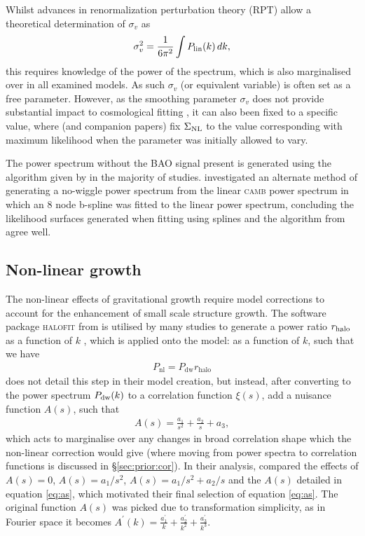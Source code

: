 \documentclass[titlesmallcaps, examinerscopy, copyrightpage]{uqthesis}
\newcommand{\camb}{\textsc{camb}}
\newcommand{\halofit}{\textsc{halofit}}
\begin{document}
Whilst advances in renormalization perturbation theory (RPT)  \citep{CrocceScoccimarro2008} allow a theoretical determination of $\sigma_v$ as
\begin{align} \label{eq:sigmav}
\sigma_v^2 = \frac{1}{6\pi^2} \int P_{\rm{lin}}(k)\, dk,
\end{align}
this requires knowledge of the power of the spectrum, which is also marginalised over in all examined models. As such $\sigma_v$ (or equivalent variable) is often set as a free parameter. However, as the smoothing parameter $\sigma_v$ does not provide substantial impact to cosmological fitting \citep{ReidPercival2010, XuPadmanabhan2012}, it can also been fixed to a specific value, where \citet{XuPadmanabhan2012} (and companion papers) fix $\Sigma_{\rm{NL}}$ to the value corresponding with maximum likelihood when the parameter was initially allowed to vary.



The power spectrum without the BAO signal present is generated using the algorithm given by \citet{EisensteinHu1998} in the majority of studies. \citet{ReidPercival2010} investigated an alternate method of generating a no-wiggle power spectrum from the linear \camb{} power spectrum in which an 8 node b-spline was fitted to the linear power spectrum, concluding the likelihood surfaces generated when fitting using splines and the algorithm from \citet{EisensteinHu1998} agree well.


\subsection{Non-linear growth}

The non-linear effects of gravitational growth require model corrections to account for the enhancement of small scale structure growth. The software package \halofit{} from \citet{Smith2003} is utilised by many studies to generate a power ratio $r_{\rm{halo}}$ as a function of $k$ \citep{ReidPercival2010, BlakeDavis2011, ChuangWang2012}, which is applied onto the model:
 as a function of $k$, such that we have
\begin{align}
P_{\text{nl}} = P_{\text{dw}} r_{\text{halo}}
\end{align}
\citet{XuPadmanabhan2012} does not detail this step in their model creation, but instead, after converting to the power spectrum $P_{\rm{dw}}(k)$ to a correlation function $\xi(s)$, add a nuisance function $A(s)$, such that
\begin{align} \label{eq:as}
A(s) = \frac{a_1}{s^2} + \frac{a_2}{s} + a_3,
\end{align}
which acts to marginalise over any changes in broad correlation shape which the non-linear correction would give (where moving from power spectra to correlation functions is discussed in \S\ref{sec:prior:cor}). In their analysis, \citet{XuPadmanabhan2012} compared the effects of $A(s) = 0$, $A(s) = a_1 / s^2$, $A(s) = a_1 / s^2 + a_2 / s$ and the $A(s)$ detailed in equation \eqref{eq:as}, which motivated their final selection of equation \eqref{eq:as}. The original function $A(s)$ was picked due to transformation simplicity, as in Fourier space it becomes $A^\prime(k) = \frac{a^\prime_1}{k} + \frac{a^\prime_2}{k^2} + \frac{a^\prime_3}{k^3}$.
\end{document}
